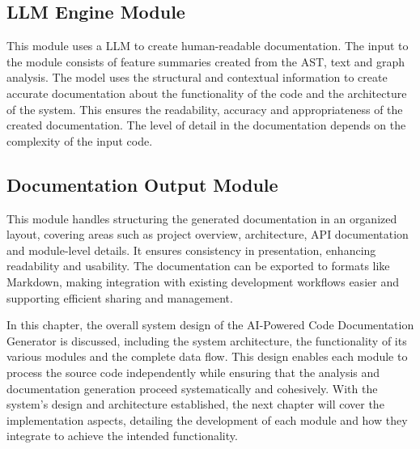 \subsection{LLM Engine Module}
\hspace{0.5cm}
This module uses a LLM to create human-readable documentation. The input to the module consists of feature summaries created from the AST, text and graph analysis. The model uses the structural and contextual information to create accurate documentation about the functionality of the code and the architecture of the system. This ensures the readability, accuracy and appropriateness of the created documentation. The level of detail in the documentation depends on the complexity of the input code.

\subsection{Documentation Output Module}
\hspace{0.5cm}
This module handles structuring the generated documentation in an organized layout, covering areas such as project overview, architecture, API documentation and module-level details. It ensures consistency in presentation, enhancing readability and usability. The documentation can be exported to formats like Markdown, making integration with existing development workflows easier and supporting efficient sharing and management.
\newline
\par In this chapter, the overall system design of the AI-Powered Code Documentation Generator is discussed, including the system architecture, the functionality of its various modules and the complete data flow. This design enables each module to process the source code independently while ensuring that the analysis and documentation generation proceed systematically and cohesively. With the system’s design and architecture established, the next chapter will cover the implementation aspects, detailing the development of each module and how they integrate to achieve the intended functionality.
